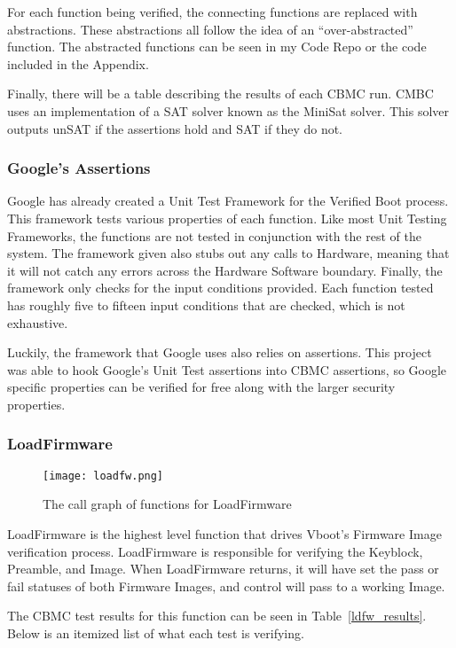 \documentclass[../report.tex]{subfiles}
\begin{document}
For each function being verified, the connecting functions are replaced with
abstractions.
These abstractions all follow the idea of an ``over-abstracted'' function.
The abstracted functions can be seen in my Code Repo or the code included in the
Appendix.

Finally, there will be a table describing the results of each CBMC run.
CMBC uses an implementation of a SAT solver known as the MiniSat solver\cite{minisat}.
This solver outputs unSAT if the assertions hold and SAT if they do not. 

\subsubsection{Google's Assertions}

Google has already created a Unit Test Framework for the Verified Boot process.
This framework tests various properties of each function.
Like most Unit Testing Frameworks, the functions are not tested in conjunction
with the rest of the system.
The framework given also stubs out any calls to Hardware, meaning that it 
will not catch any errors across the Hardware Software boundary.
Finally, the framework only checks for the input conditions provided. 
Each function tested has roughly five to fifteen input conditions that are
checked, which is not exhaustive.

Luckily, the framework that Google uses also relies on assertions.
This project was able to hook Google's Unit Test assertions into CBMC
assertions, so Google specific properties can be verified for free along with 
the larger security properties. 

\subsubsection{LoadFirmware}

\begin{figure}[!htbp]
  \centering
  \texttt{[image: loadfw.png]}
  \caption{The call graph of functions for LoadFirmware}\label{fig:loadfw}
\end{figure}

LoadFirmware is the highest level function that drives Vboot's Firmware Image
verification process.
LoadFirmware is responsible for verifying the Keyblock, Preamble, and Image.
When LoadFirmware returns, it will have set the pass or fail statuses of both Firmware Images, and control will pass to a working Image.

The CBMC test results for this function can be seen in Table~\ref{ldfw_results}. 
Below is an itemized list of what each test is verifying.
\end{document}
